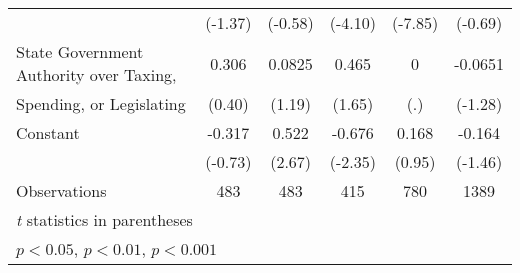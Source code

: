 {\begin{tabular}{l*{5}{c}}
                                        &   (-1.37)         &   (-0.58)         &   (-4.10)         &   (-7.85)         &   (-0.69)         \\
\addlinespace
State Government Authority over Taxing, &     0.306         &    0.0825         &     0.465         &         0         &   -0.0651         \\
Spending, or Legislating                &    (0.40)         &    (1.19)         &    (1.65)         &       (.)         &   (-1.28)         \\
\addlinespace
Constant                                &    -0.317         &     0.522\sym{**} &    -0.676\sym{*}  &     0.168         &    -0.164         \\
                                        &   (-0.73)         &    (2.67)         &   (-2.35)         &    (0.95)         &   (-1.46)         \\
\midrule
Observations                            &       483         &       483         &       415         &       780         &      1389         \\
\bottomrule
\multicolumn{6}{l}{\footnotesize \textit{t} statistics in parentheses}\\
\multicolumn{6}{l}{\footnotesize \sym{*} \(p<0.05\), \sym{**} \(p<0.01\), \sym{***} \(p<0.001\)}\\
\end{tabular}
}

